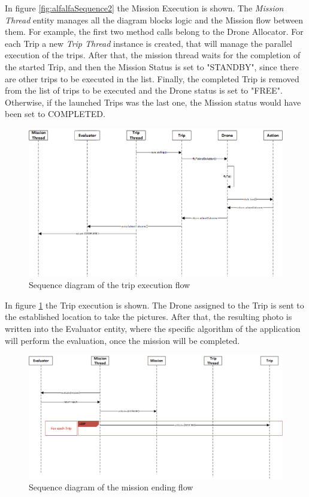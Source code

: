 In figure \ref{fig:alfalfaSequence2} the Mission Execution is shown.
The \textit{Mission Thread} entity manages all the diagram blocks logic and the Mission flow between them. For example, the first two method calls belong to the Drone Allocator. 
For each Trip a new \textit{Trip Thread} instance is created, that will manage the parallel execution of the trips.
After that, the mission thread waits for the completion of the started Trip, and then the Mission Status is set to "STANDBY", since there are other trips to be executed in the list.
Finally, the completed Trip is removed from the list of trips to be executed and the Drone status is set to "FREE".
Otherwise, if the launched Trips was the last one, the Mission status would have been set to COMPLETED.
\\

\begin{figure}[H]
  \centering
  \includegraphics[width=\linewidth]{pictures/Alfalfa_Sequence_TripExecution.png}
  \caption{Sequence diagram of the trip execution flow}
  \label{fig:alfalfaSequence3}
\end{figure}

In figure \ref{fig:alfalfaSequence3} the Trip execution is shown.
The Drone assigned to the Trip is sent to the established location to take the pictures.
After that, the resulting photo is written into the Evaluator entity, where the specific algorithm of the application will perform the evaluation, once the mission will be completed.
\\

\begin{figure}[H]
  \centering
  \includegraphics[width=\linewidth]{pictures/Alfalfa_Sequence_MissionEnd.png}
  \caption{Sequence diagram of the mission ending flow}
  \label{fig:alfalfaSequence4}
\end{figure}

